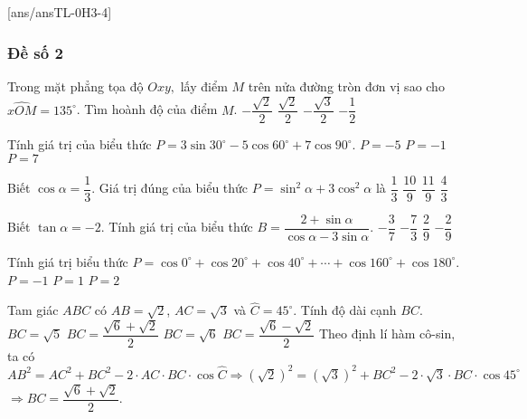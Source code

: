[ans/ansTL-0H3-4]
\setcounter{ex}{0}
\subsubsection{Đề số 2}

\begin{ex}%
	Trong mặt phẳng tọa độ $Oxy,$ lấy điểm $M$ trên nửa đường tròn đơn vị sao cho $\widehat{xOM}=135^\circ$. Tìm hoành độ của điểm $M$.
	\choice
	{\True $-\dfrac{\sqrt{2}}{2}$}
	{$\dfrac{\sqrt{2}}{2}$}
	{$-\dfrac{\sqrt{3}}{2}$}
	{$-\dfrac{1}{2}$}
\end{ex}

\begin{ex}%
	Tính giá trị của biểu thức $P=3\sin30^\circ-5\cos60^\circ+7\cos90^\circ$.
	{$P=-5$}
	{\True $P=-1$}
	{$P=7$}
\end{ex}

\begin{ex}%
	Biết $\cos\alpha=\dfrac{1}{3}$. Giá trị đúng của biểu thức $P=\sin^2\alpha+3\cos^2\alpha$ là
	\choice
	{$\dfrac{1}{3}$}
	{$\dfrac{10}{9}$}
	{$\dfrac{11}{9}$}
	{\True $\dfrac{4}{3}$}
\end{ex}

\begin{ex}%
	Biết $\tan\alpha=-2$. Tính giá trị của biểu thức $B=\dfrac{2+\sin\alpha}{\cos\alpha-3\sin\alpha}$.
	\choice
	{\True $-\dfrac{3}{7}$}
	{$-\dfrac{7}{3}$}
	{$\dfrac{2}{9}$}
	{$-\dfrac{2}{9}$}
\end{ex}

\begin{ex}%
	Tính giá trị biểu thức $P=\cos 0^\circ + \cos 20^\circ+ \cos 40^\circ + \cdots + \cos 160^\circ + \cos 180^\circ$.
	{$P=-1$}
	{$P=1$}
	{$P=2$}
\end{ex}

\begin{ex}%
	Tam giác $ ABC$ có $ AB=\sqrt{2}$, $AC=\sqrt{3}$ và $ \widehat{C}=45^\circ $. Tính độ dài cạnh $ BC$.
	\choice
	{$ BC=\sqrt{5}$}
	{\True $ BC=\dfrac{\sqrt{6}+\sqrt{2}}{2}$}
	{$ BC=\sqrt{6}$}
	{$ BC=\dfrac{\sqrt{6}-\sqrt{2}}{2}$}
	\loigiai
	{Theo định lí hàm cô-sin, ta có\\
		$ AB^2=AC^2+BC^2-2\cdot AC\cdot BC\cdot \cos \widehat{C}\Rightarrow {(\sqrt{2} )}^2={(\sqrt{3} )}^2+BC^2-2\cdot \sqrt{3}\cdot BC\cdot \cos 45^\circ $ \\
		$ \Rightarrow BC=\dfrac{\sqrt{6}+\sqrt{2}}{2}$.}
\end{ex}

